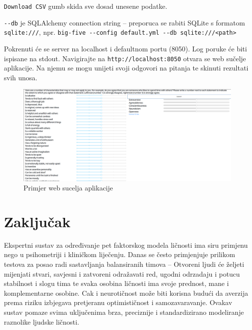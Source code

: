 \documentclass[times, utf8, seminar]{fer}
\begin{document}
\verb|Download CSV| gumb skida sve dosad unesene podatke.

\verb|--db| je SQLAlchemy connection string -- preporuca se rabiti SQLite s formatom \texttt{sqlite:///}, npr. \verb|big-five --config default.yml --db sqlite:///<path>|

Pokrenuti će se server na localhost i defaultnom portu (8050). Log poruke će biti ispisane na stdout. Navigirajte na \verb|http://localhost:8050| otvara se web sučelje aplikacije. Na njemu se mogu unijeti svoji odgovori na pitanja te skinuti rezultati svih unosa.

\begin{figure}[h]
    \caption{Primjer web sucelja aplikacije}
    \centering
    \includegraphics[width=\textwidth]{app}
\end{figure}
\chapter{Zaključak}

Ekspertni sustav za određivanje pet faktorskog modela ličnosti ima siru primjenu nego u psihometriji i kliničkom liječenju. Danas se često primjenjuje prilikom testova za posao radi sastavljanja balansiranih timova -- Otvoreni ljudi će željeti mijenjati stvari, savjesni i zatvoreni odražavati red, ugodni odrzadaju i potucu stabilnost i slogu tima te svaka osobina ličnosti ima svoje prednost, mane i komplementarne osobine. Cak i neurotičnost može biti korisna budući da averzija prema riziku izbjegava pretjeranu optimističnost i samozavaravanje.
Ovakav sustav pomaze svima uključenima brza, preciznije i standardizirano modeliranje raznolike ljudske ličnosti.



\end{document}
